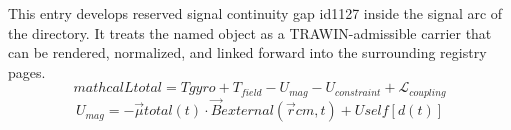 
\begin{tzpsnapshot}
\end{tzpsnapshot}

This entry develops reserved signal continuity gap id1127 inside the signal arc of the directory. It treats the named object as a TRAWIN-admissible carrier that can be rendered, normalized, and linked forward into the surrounding registry pages.
\[
mathcal{L} {total} = T {gyro} + T_{field} - U_{mag} - U_{constraint} + \mathcal{L}_{coupling}
\]
\[
U_{mag} = -\vec{\mu} {total}(t) \cdot \vec{B} {external}(\vec{r} {cm}, t) + U {self}[d(t)]
\]

